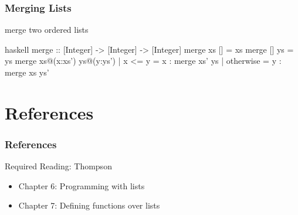 \documentclass[dvipsnames]{beamer}
\theoremstyle{plain}
\begin{document}
\begin{frame}[fragile]
  \frametitle{Merging Lists}

  \begin{exampleblock}{merge two ordered lists}
    \begin{pygments}{haskell}
merge :: [Integer] -> [Integer] -> [Integer]
merge xs     []             = xs
merge []     ys             = ys
merge xs@(x:xs') ys@(y:ys')
  | x <= y    = x : merge xs' ys
  | otherwise = y : merge xs  ys'
    \end{pygments}
  \end{exampleblock}
\end{frame}

\section*{References}

\begin{frame}
  \frametitle{References}

  \begin{block}{Required Reading: Thompson}
    \begin{itemize}
      \item Chapter 6: \alert{Programming with lists}
      \item Chapter 7: \alert{Defining functions over lists}
    \end{itemize}
  \end{block}
\end{frame}
\end{document}
